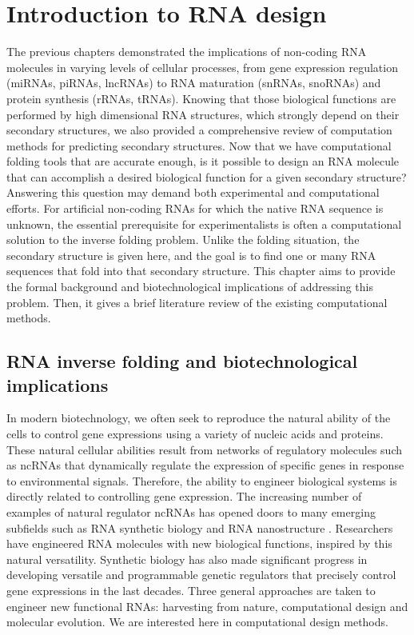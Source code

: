 \chapter{Introduction to RNA design}\label{ch:review_design} %
The previous chapters demonstrated the implications of non-coding RNA molecules in varying levels of cellular processes, from gene expression regulation (miRNAs, piRNAs, lncRNAs) to RNA maturation (snRNAs, snoRNAs) and protein synthesis (rRNAs, tRNAs). Knowing that those biological functions are performed by high dimensional RNA structures, which strongly depend on their secondary structures,  we also provided a comprehensive review of computation methods for predicting secondary structures. Now that we have computational folding tools that are accurate enough, is it possible to design an RNA molecule that can accomplish a desired biological function for a given secondary structure? Answering this question may demand both experimental and computational efforts. For artificial non-coding RNAs for which the native RNA sequence is unknown, the essential prerequisite for experimentalists is often a computational solution to the inverse folding problem. Unlike the folding situation, the secondary structure is given here, and the goal is to find one or many  RNA sequences that fold into that secondary structure. This chapter aims to provide the formal background and biotechnological implications of addressing this problem. Then, it gives a brief literature review of the existing computational methods. 

\section{RNA inverse folding and biotechnological implications}  

In modern biotechnology, we often seek to reproduce the natural ability of the cells to control gene expressions using a variety of nucleic acids and proteins. These natural cellular abilities result from networks of regulatory molecules such as ncRNAs that dynamically regulate the expression of specific genes in response to environmental signals. Therefore, the ability to engineer biological systems is directly related to controlling gene expression. The increasing number of examples of natural regulator ncRNAs has opened doors to many emerging subfields such as RNA synthetic biology \cite{chappell2015renaissance, isaacs2006rna} and RNA nanostructure \cite{jaeger2001tectorna, guo2010emerging}. Researchers have engineered RNA molecules with new biological functions, inspired by this natural versatility. Synthetic biology has also made significant progress in developing versatile and programmable genetic regulators that precisely control gene expressions in the last decades. Three general approaches are taken to engineer new functional RNAs: harvesting from nature, computational design and molecular evolution. We are interested here in computational design methods.

